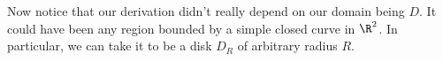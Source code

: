 \documentclass[a4paper]{article}
\begin{document}
%

Now notice that our derivation didn't really depend on our domain being $D$. It could have been any region bounded by a simple closed curve in $\R^2$. In particular, we can take it to be a disk $D_R$ of arbitrary radius $R$.
\end{document}
